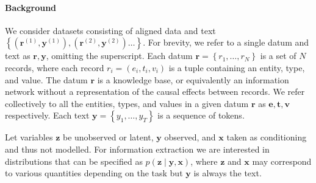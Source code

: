 \documentclass[11pt]{article}
\newcommand\set[1]{\left\{#1\right\}}
\newcommand{\be}{\mathbf{e}}
\newcommand{\br}{\mathbf{r}}
\newcommand{\bt}{\mathbf{t}}
\newcommand{\bv}{\mathbf{v}}
\newcommand{\bx}{\mathbf{x}}
\newcommand{\by}{\mathbf{y}}
\newcommand{\bz}{\mathbf{z}}
\begin{document}
\begin{comment}
Neural models for language generation have seen much progress in recent years,
with state of the art performance in both language modeling and translation
\citep{yang2017moslm,allattn}.
By integrating the powerful language modeling capabilities of neural networks with
the inductive biases of graphical models through LVMs,
we can leverage the LVM framework to derive a principled method
for training an information extraction system with less supervision.
Namely, we turn to an efficient technique for training hard attention 
in machine translation models that relies on variational inference \citep{deng2018attn}.
This technique is applicable to sequential LVMs such as hidden Markov models 
and hidden semi-Markov models (HSMMs).
HSMMs have been applied to small scale datasets for text generation \citep{wiseman2018template}
as well as without integrating neural networks \citep{liang2009semalign}.
We will scale sequential LVMs to large datasets through variational inference and use
the signal from our generative model in order to train an information extraction system.
\end{comment}

\paragraph{Background}
We consider datasets consisting of aligned data and text
$\set{(\br^{(1)}, \by^{(1)}),(\br^{(2)},\by^{(2)})\ldots}$.
For brevity, we refer to a single datum and text as $\br,\by$, omitting the superscript.
Each datum $\br = \set{r_1,\ldots,r_N}$ is a set of $N$ records, where each record $r_i = (e_i, t_i, v_i)$
is a tuple containing an entity, type, and value.
The datum $\br$ is a knowledge base, or equivalently an information network
without a representation of the causal effects between records.
We refer collectively to all the entities, types, and values in a given datum $\br$ as
$\be,\bt,\bv$ respectively.
Each text $\by = \set{y_1,\ldots,y_T}$ is a sequence of tokens.

Let variables $\bz$ be unobserved or latent, $\by$ observed, and $\bx$ taken as conditioning
and thus not modelled.
For information extraction we are interested in distributions that can be specified as $p(\bz\mid\by,\bx)$,
where $\bz$ and $\bx$ may correspond to various quantities depending on the task
but $\by$ is always the text.
\end{document}
